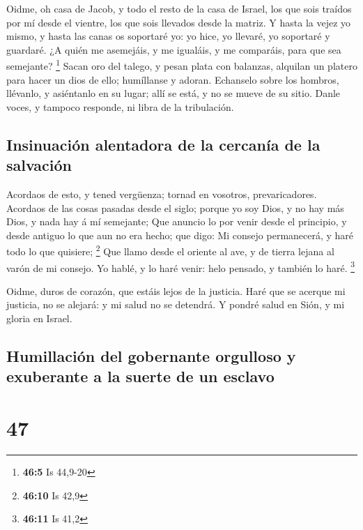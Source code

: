  Oidme, oh casa de Jacob, y todo el resto de la casa de
Israel, los que sois traídos por mí desde el vientre, los que sois
llevados desde la matriz.  Y hasta la vejez yo mismo, y
hasta las canas os soportaré yo: yo hice, yo llevaré, yo soportaré y
guardaré.  ¿A quién me asemejáis, y me igualáis, y me
comparáis, para que sea semejante? \footnote{\textbf{46:5} Is 44,9-20}
 Sacan oro del talego, y pesan plata con balanzas, alquilan
un platero para hacer un dios de ello; humíllanse y adoran. 
Echanselo sobre los hombros, llévanlo, y asiéntanlo en su lugar; allí se
está, y no se mueve de su sitio. Danle voces, y tampoco responde, ni
libra de la tribulación.

\hypertarget{insinuaciuxf3n-alentadora-de-la-cercanuxeda-de-la-salvaciuxf3n}{%
\subsection{Insinuación alentadora de la cercanía de la
salvación}\label{insinuaciuxf3n-alentadora-de-la-cercanuxeda-de-la-salvaciuxf3n}}

 Acordaos de esto, y tened vergüenza; tornad en vosotros,
prevaricadores.  Acordaos de las cosas pasadas desde el
siglo; porque yo soy Dios, y no hay más Dios, y nada hay á mí semejante;
 Que anuncio lo por venir desde el principio, y desde
antiguo lo que aun no era hecho; que digo: Mi consejo permanecerá, y
haré todo lo que quisiere; \footnote{\textbf{46:10} Is 42,9}
 Que llamo desde el oriente al ave, y de tierra lejana al
varón de mi consejo. Yo hablé, y lo haré venir: helo pensado, y también
lo haré. \footnote{\textbf{46:11} Is 41,2}

 Oidme, duros de corazón, que estáis lejos de la justicia.
 Haré que se acerque mi justicia, no se alejará: y mi salud
no se detendrá. Y pondré salud en Sión, y mi gloria en Israel.

\hypertarget{humillaciuxf3n-del-gobernante-orgulloso-y-exuberante-a-la-suerte-de-un-esclavo}{%
\subsection{Humillación del gobernante orgulloso y exuberante a la
suerte de un
esclavo}\label{humillaciuxf3n-del-gobernante-orgulloso-y-exuberante-a-la-suerte-de-un-esclavo}}

\hypertarget{section-46}{%
\section{47}\label{section-46}}

